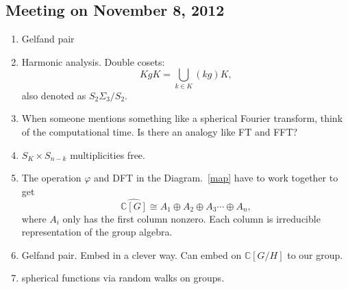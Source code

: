 \documentclass[10pt,reqno]{amsart}
\newcommand{\C}{\mathbb{C}}
\theoremstyle{definition}
\numberwithin{equation}{section}
\begin{document}
\subsection{Meeting on November 8, 2012}
\begin{enumerate}
\item Gelfand pair
\item Harmonic analysis. Double cosets:
\[KgK = \bigcup_{k\in K} (kg)K,\]
also denoted as $S_2\Sigma_3/S_2.$
\item When someone mentions something like
a spherical Fourier transform, think
of the computational time. Is there
an analogy like FT and FFT?
\item $S_K\times S_{n-k}$ multiplicities free.
\item The operation $\varphi$ and 
DFT in the Diagram.~\eqref{map} have
to work together to get
\[\hat{\C[G]}\cong
A_1\oplus A_2\oplus A_3\cdots \oplus A_n,\]
where $A_i$ only has the first column
nonzero. Each column is irreducible representation
of the group algebra.
\item Gelfand pair. Embed in a clever way.
Can embed on $\C[G/H]$ to our group.
\item spherical functions via random walks
on groups.
\end{enumerate}

%
%
\end{document}
